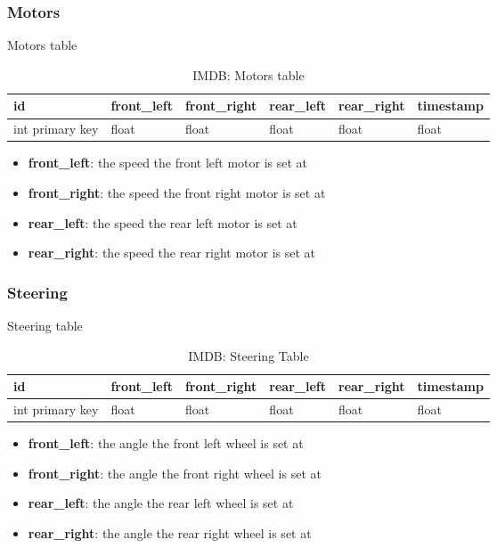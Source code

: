 \subsubsection{Motors}
\begin{table}[!htb]
\centering
\caption{Motors table}
\label{tab:db-motors}
\begin{tabular}{|l|l|l|l|l|l|}
\toprule
id              & front\_left & front\_right & rear\_left & rear\_right & timestamp \\ \midrule
int primary key & float       & float        & float      & float       & float
\end{tabular}
\caption{IMDB: Motors table}
\label{tab:db-motors}
\end{table}
\begin{itemize}
\item{\textbf{front\_left}}: the speed the front left motor is set at
\item{\textbf{front\_right}}: the speed the front right motor is set at
\item{\textbf{rear\_left}}: the speed the rear left motor is set at
\item{\textbf{rear\_right}}: the speed the rear right motor is set at
\end{itemize}


\subsubsection{Steering}
\begin{table}[!htb]
\centering
\caption{Steering table}
\label{tab:db-steering}
\begin{tabular}{|l|l|l|l|l|l|}
\toprule
id              & front\_left & front\_right & rear\_left & rear\_right & timestamp \\ \midrule
int primary key & float       & float        & float      & float       & float
\end{tabular}
\caption{IMDB: Steering Table}
\label{tab:db-steering}
\end{table}
\begin{itemize}
\item{\textbf{front\_left}}: the angle the front left wheel is set at
\item{\textbf{front\_right}}: the angle the front right wheel is set at
\item{\textbf{rear\_left}}:  the angle the rear left wheel is set at
\item{\textbf{rear\_right}}:  the angle the rear right wheel is set at
\end{itemize}


